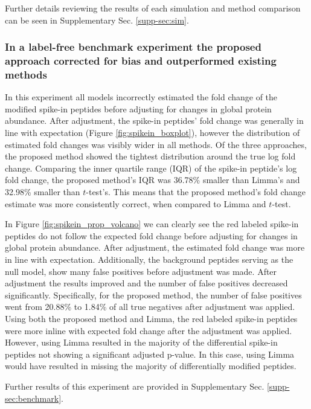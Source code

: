 \documentclass[mcp]{article}
\numberwithin{table}{section}
\begin{document}
Further details reviewing the results of each simulation and  method comparison can be seen in Supplementary Sec. \ref{supp-sec:sim}. 

\subsubsection*{In a label-free benchmark experiment the proposed approach corrected for bias and outperformed existing methods}

In this experiment all models incorrectly estimated the fold change of the modified spike-in peptides before adjusting for changes in global protein abundance. After adjustment, the spike-in peptides' fold change was generally in line with expectation (Figure \ref{fig:spikein_boxplot}), however the distribution of estimated fold changes was visibly wider in all methods. Of the three approaches, the proposed method showed the tightest distribution around the true log fold change. Comparing the inner quartile range (IQR) of the spike-in peptide's log fold change, the proposed method's IQR was 36.78\% smaller than Limma's and 32.98\% smaller than $t$-test's. This means that the proposed method's fold change estimate was more consistently correct, when compared to Limma and $t$-test.

In Figure \ref{fig:spikein_prop_volcano} we can clearly see the red labeled spike-in peptides do not follow the expected fold change before adjusting for changes in global protein abundance. After adjustment, the estimated fold change was more in line with expectation. Additionally, the background peptides serving as the null model, show many false positives before adjustment was made. After adjustment the results improved and the number of false positives decreased significantly. Specifically, for the proposed method, the number of false positives went from 20.88\% to 1.84\% of all true negatives after adjustment was applied. Using both the proposed method and Limma, the red labeled spike-in peptides were more inline with expected fold change after the adjustment was applied. However, using Limma resulted in the majority of the differential spike-in peptides not showing a significant adjusted p-value. In this case, using Limma would have resulted in missing the majority of differentially modified peptides.

Further results of this experiment are provided in Supplementary Sec. \ref{supp-sec:benchmark}. 
\end{document}

